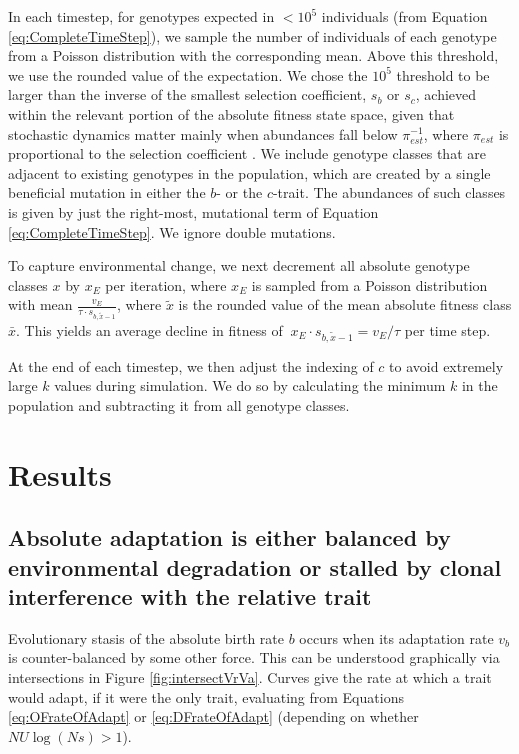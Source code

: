 \documentclass[9pt,twocolumn,twoside,lineno]{gsajnl}
\begin{document}
In each timestep, for genotypes expected in $<10^5$ individuals (from Equation \eqref{eq:CompleteTimeStep}), we sample the number of individuals of each genotype from a Poisson distribution with the corresponding mean. Above this threshold, we use the rounded value of the expectation. We chose the $10^5$ threshold to be larger than the inverse of the smallest selection coefficient, $s_b$ or $s_c$, achieved within the relevant portion of the absolute fitness state space, given that stochastic dynamics matter mainly when abundances fall below $\pi_{est}^{-1}$, where $\pi_{est}$ is proportional to the selection coefficient \citep{desai2007beneficial}. We include genotype classes that are adjacent to  existing genotypes in the population, which are created by a single beneficial mutation in either the $b$- or the $c$-trait. The abundances of such classes is given by just the right-most, mutational term of Equation \eqref{eq:CompleteTimeStep}. We ignore double mutations.

To capture environmental change, we next decrement all absolute genotype classes $x$ by $x_E$ per iteration, where $x_E$ is sampled from a Poisson distribution with mean ${\frac{v_E}{\tau\cdot s_{b,\tilde{x}-1}}}$, where $\tilde{x}$ is the rounded value of the mean absolute fitness class $\bar{x}$. This yields an average decline in fitness of $~x_E\cdot s_{b,\tilde{x}-1} = v_E/\tau$ per time step.

At the end of each timestep, we then adjust the indexing of $c$ to avoid extremely large $k$ values during simulation. We do so by calculating the minimum $k$ in the population and subtracting it from all genotype classes.

\section{Results}

\subsection{Absolute adaptation is either balanced by environmental degradation or stalled by clonal interference with the relative trait} 
\label{sec:results:intersections}
Evolutionary stasis of the absolute birth rate $b$ occurs when its adaptation rate $v_b$ is counter-balanced by some other force. This can be understood graphically via intersections in Figure \ref{fig:intersectVrVa}. Curves give the rate at which a trait would adapt, if it were the only trait, evaluating from Equations \ref{eq:OFrateOfAdapt} or \ref{eq:DFrateOfAdapt} (depending on whether $NU\log(Ns) > 1$). 
\end{document}

